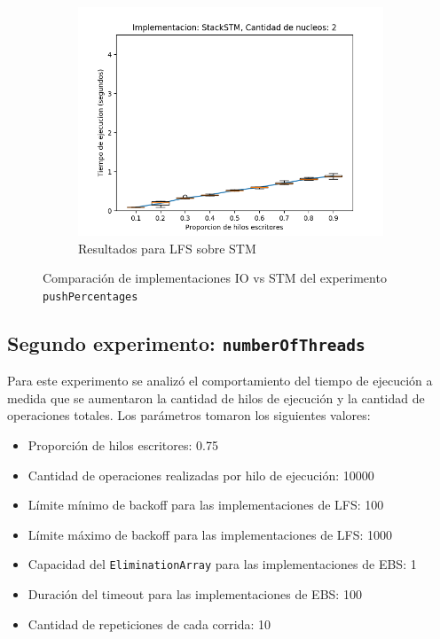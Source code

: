 \begin{figure}[!h]
\begin{subfigure}[b]{0.49\textwidth}
        \includegraphics[width=\textwidth]{images/pushPercentages/plots/expStackSTM-2}
        \caption{Resultados para LFS sobre STM}
        \label{subfig:pushPercentages-stackstm-2}
    \end{subfigure}
    \caption{Comparación de implementaciones IO vs STM del experimento \texttt{pushPercentages}}
    \label{fig:pushPercentages-boxplots}
\end{figure}

\clearpage
\subsection{Segundo experimento: \texttt{numberOfThreads}}\label{subsec:numberOfThreads}
Para este experimento se analizó el comportamiento del tiempo de ejecución a medida que se aumentaron la cantidad de hilos de ejecución y la cantidad de operaciones totales.
Los parámetros tomaron los siguientes valores:

\begin{itemize}
    \item Proporción de hilos escritores: 0.75
    \item Cantidad de operaciones realizadas por hilo de ejecución: 10000
    \item Límite mínimo de backoff para las implementaciones de LFS: 100
    \item Límite máximo de backoff para las implementaciones de LFS: 1000
    \item Capacidad del \texttt{EliminationArray} para las implementaciones de EBS: 1
    \item Duración del timeout para las implementaciones de EBS: 100
    \item Cantidad de repeticiones de cada corrida: 10
\end{itemize}

